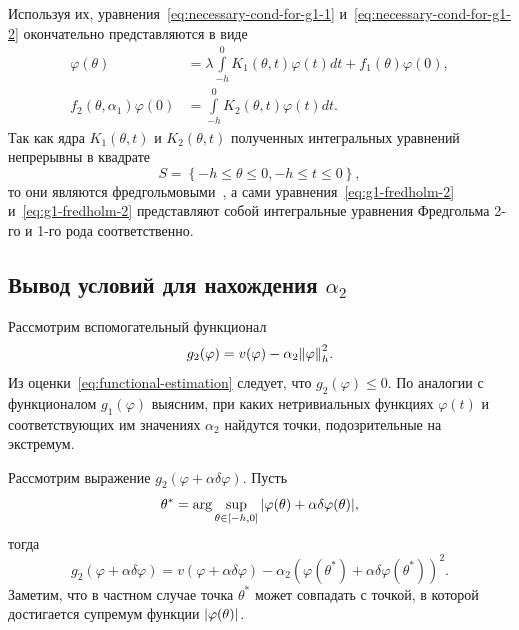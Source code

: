 \documentclass[a4paper,14pt]{article}
\theoremstyle{definition}
\begin{document}
Используя их, уравнения~\eqref{eq:necessary-cond-for-g1-1}
и~\eqref{eq:necessary-cond-for-g1-2} окончательно представляются
в виде
\begin{align}
  \label{eq:g1-fredholm-2}
  \varphi(\theta)
  &=
    \lambda
    \int\limits_{-h}^{0}
    K_1(\theta, t)
    \varphi(t)
    dt
    + f_1(\theta) \varphi(0), \\
  \label{eq:g1-fredholm-1}
  f_2(\theta, \alpha_1) \varphi(0)
  &=
    \int\limits_{-h}^{0}
    K_2(\theta, t)
    \varphi(t)
    dt.
\end{align}
Так как ядра $K_1(\theta, t)$ и $K_2(\theta, t)$ полученных интегральных
уравнений непрерывны в квадрате
\begin{equation*}
  S = \left\{ -h \leqslant \theta \leqslant 0, -h \leqslant t \leqslant 0 \right\},
\end{equation*}
то они являются фредгольмовыми~\cite[стр.~78]{manzhirov2000}, а сами
уравнения~\eqref{eq:g1-fredholm-2} и~\eqref{eq:g1-fredholm-2} представляют собой
интегральные уравнения Фредгольма 2-го и 1-го рода соответственно.

\subsection{Вывод условий для нахождения $\alpha_2$}

Рассмотрим вспомогательный функционал
\begin{equation*}
  g_2(\varphi)
  =
  v(\varphi) - \alpha_2 \norm{\varphi}_h^2.
\end{equation*}
Из оценки~\eqref{eq:functional-estimation} следует, что $g_2(\varphi) \leqslant 0$.
По аналогии с функционалом $g_1(\varphi)$ выясним, при каких нетривиальных функциях
$\varphi(t)$ и соответствующих им значениях $\alpha_2$ найдутся точки, подозрительные
на экстремум.

Рассмотрим выражение $g_2(\varphi + \alpha \delta \varphi)$. Пусть
\begin{equation*}
  \theta^*
  = \arg\sup_{\theta \in [-h, 0]} \abs{\varphi(\theta) + \alpha \delta \varphi(\theta)},
\end{equation*}
тогда
\begin{equation*}
  g_2(\varphi + \alpha \delta \varphi)
  = v(\varphi + \alpha \delta \varphi)
  - \alpha_2 {(\varphi(\theta^*) + \alpha \delta \varphi(\theta^*))}^2.
\end{equation*}
Заметим, что в частном случае точка $\theta^*$ может совпадать с точкой, в которой
достигается супремум функции $\abs{\varphi(\theta)}$.
\end{document}

